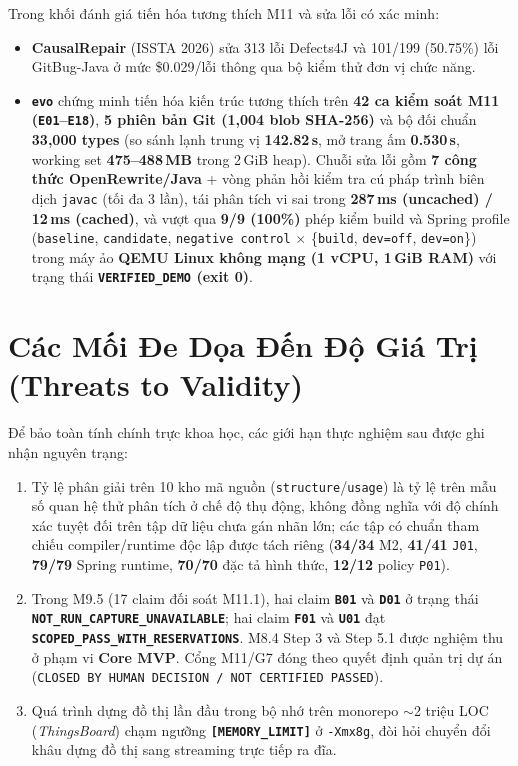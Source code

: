 \documentclass[10pt,a4paper]{article}
\begin{document}
Trong khối đánh giá tiến hóa tương thích M11 và sửa lỗi có xác minh:
\begin{itemize}
    \item \textbf{CausalRepair} (ISSTA 2026) \cite{causalrepair2026} sửa 313 lỗi Defects4J và 101/199 (50.75\%) lỗi GitBug-Java ở mức \$0.029/lỗi thông qua bộ kiểm thử đơn vị chức năng.
    \item \textbf{\texttt{evo}} chứng minh tiến hóa kiến trúc tương thích trên \textbf{42 ca kiểm soát M11 (\texttt{E01}--\texttt{E18})}, \textbf{5 phiên bản Git (1,004 blob SHA-256)} và bộ đối chuẩn \textbf{33,000 types} (so sánh lạnh trung vị \textbf{142.82\,s}, mở trang ấm \textbf{0.530\,s}, working set \textbf{475--488\,MB} trong 2\,GiB heap). Chuỗi sửa lỗi gồm \textbf{7 công thức OpenRewrite/Java} + vòng phản hồi kiểm tra cú pháp trình biên dịch \texttt{javac} (tối đa 3 lần), tái phân tích vi sai trong \textbf{287\,ms (uncached) / 12\,ms (cached)}, và vượt qua \textbf{9/9 (100\%)} phép kiểm build và Spring profile (\texttt{baseline}, \texttt{candidate}, \texttt{negative control} $\times$ \{\texttt{build}, \texttt{dev=off}, \texttt{dev=on}\}) trong máy ảo \textbf{QEMU Linux không mạng (1 vCPU, 1\,GiB RAM)} với trạng thái \textbf{\texttt{VERIFIED\_DEMO} (exit 0)}.
\end{itemize}

\section{Các Mối Đe Dọa Đến Độ Giá Trị (Threats to Validity)}

Để bảo toàn tính chính trực khoa học, các giới hạn thực nghiệm sau được ghi nhận nguyên trạng:
\begin{enumerate}
    \item Tỷ lệ phân giải trên 10 kho mã nguồn (\texttt{structure}/\texttt{usage}) là tỷ lệ trên mẫu số quan hệ thử phân tích ở chế độ thụ động, không đồng nghĩa với độ chính xác tuyệt đối trên tập dữ liệu chưa gán nhãn lớn; các tập có chuẩn tham chiếu compiler/runtime độc lập được tách riêng (\textbf{34/34} M2, \textbf{41/41} \texttt{J01}, \textbf{79/79} Spring runtime, \textbf{70/70} đặc tả hình thức, \textbf{12/12} policy \texttt{P01}).
    \item Trong M9.5 (17 claim đối soát M11.1), hai claim \textbf{\texttt{B01}} và \textbf{\texttt{D01}} ở trạng thái \textbf{\texttt{NOT\_RUN\_CAPTURE\_UNAVAILABLE}}; hai claim \textbf{\texttt{F01}} và \textbf{\texttt{U01}} đạt \textbf{\texttt{SCOPED\_PASS\_WITH\_RESERVATIONS}}. M8.4 Step 3 và Step 5.1 được nghiệm thu ở phạm vi \textbf{Core MVP}. Cổng M11/G7 đóng theo quyết định quản trị dự án (\texttt{CLOSED BY HUMAN DECISION / NOT CERTIFIED PASSED}).
    \item Quá trình dựng đồ thị lần đầu trong bộ nhớ trên monorepo $\sim$2 triệu LOC (\emph{ThingsBoard}) chạm ngưỡng \textbf{\texttt{[MEMORY\_LIMIT]}} ở \texttt{-Xmx8g}, đòi hỏi chuyển đổi khâu dựng đồ thị sang streaming trực tiếp ra đĩa.
\end{enumerate}
\end{document}
